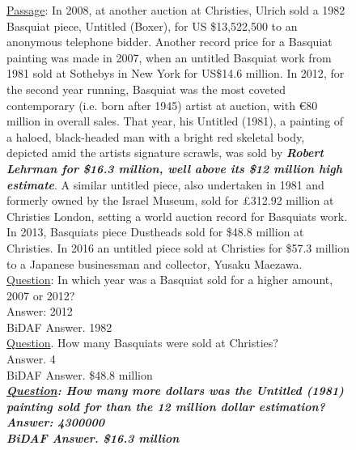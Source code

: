 \documentclass[11pt,a4paper]{article}
\begin{document}
\begin{figure}
\tiny
{\underline{Passage}: {\color{purple}In 2008, at another auction at Christies, Ulrich sold a 1982 Basquiat piece, Untitled (Boxer)}, for US \$13,522,500 to an anonymous telephone bidder. Another record price for a Basquiat painting was made {\color{olive}in 2007, when an untitled Basquiat work from 1981 sold at Sothebys in New York for US\$14.6 million}. {\color{olive}In 2012}, for the second year running, Basquiat was the most coveted contemporary (i.e. born after 1945) artist at auction, with {\color{olive}\euro 80 million in overall sales}. {\color{olive}That year}, his Untitled (1981), a painting of a haloed, black-headed man with a bright red skeletal body, depicted amid the artists signature scrawls, was  sold by \textbf{\textit{Robert Lehrman for {\color{olive}\$16.3 million}, well above its  \$12 million high estimate}}. A similar untitled piece, also undertaken in 1981 and formerly owned by the Israel Museum, {\color{purple}sold for \pounds312.92 million at Christies} London, setting a world auction record for Basquiats work. In 2013, Basquiats piece {\color{purple}Dustheads sold for \$48.8 million at Christies}. In 2016 an untitled piece sold at {\color{purple}Christies for \$57.3 million to a Japanese businessman} and collector, Yusaku Maezawa.
\\
{\color{olive} \underline{Question}: In which year was a Basquiat sold for a higher amount, 2007 or 2012?\\
    Answer: 2012\\
    BiDAF Answer. 1982
} \\
{\color{purple}
    \underline{Question}. How many Basquiats were sold at Christies?\\
    Answer. 4\\
    BiDAF Answer. \$48.8 million
}\\
\textbf{\textit{ \underline{Question}: How many more dollars was the Untitled (1981) painting sold for than the 12 million dollar estimation?\\
    Answer: 4300000\\
    BiDAF Answer. \$16.3 million
}}
}\\
    

\end{figure}
\end{document}
